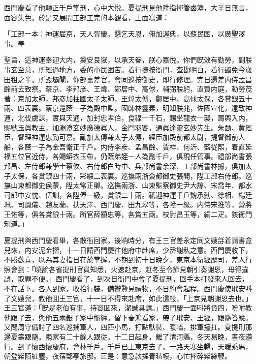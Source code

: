 西門慶看了他轉正千戶掌刑，心中大悦。夏提刑見他陞指揮管鹵簿，大半日無言，面容失色。於是又展開工部工完的本觀看，上面寫道：

\begin{myquote}[\markfont]
「工部一本：神運届京，天人胥慶。懇乞天恩，俯加渥典，以蘇民困，以廣聖澤事。奉

聖旨，這神運奉迎大内，奠安艮嶽，以承天眷，朕心嘉悦。你們旣效有勤勞，副朕事玄至意，所經過地方，委的小民困苦。着行撫按衙門，查勘明白，着行蠲免今歲田租之半。所毀壩閘，你部裏差官，會同巡按御史，即行修理。完日還差内侍孟昌齡前去致祭。蔡京、李邦彦、王煒、鄭居中、高俅，輔弼朕躬，直贊内庭，勳勞茂著：京加太師，邦彦加柱國太子太師，王煒太傅，鄭居中、高俅太保，各賞銀五十兩、四表裏。蔡京還蔭一子為殿中監。國師林靈素，明知朕兆，佐國宣化，遠致神運，北伐虜謀，實與天通，加封忠孝伯，食祿一千石，賜坐龍衣一襲，肩輿入内，賜號玉眞教主，加淵澄玄妙廣德眞人，金門羽客，通眞達靈玄妙先生。朱勔、黄經臣，督理神運忠勤可嘉。勔加太傅兼太子太傅，經臣加殿前都太尉，提督御前人船，各蔭一子為金吾衛正千戶。内侍李彦、孟昌齡、賈祥、何沂、藍従熙，着直延福五位官近侍，各賜蟒衣玉帶，仍蔭弟姪一人為副千戶，俱現任管事。禮部尚書張邦昌、左侍郎兼學士蔡攸、右侍郎白時中、兵部尚書余深、工部尚書林攄，俱加太子太保，各賞銀四十兩，彩緞二表裏。巡撫兩浙僉都御史張閣，陞工部右侍郎。巡撫山東都御史侯蒙，陞太常正卿。巡撫兩浙、山東監察御史尹大諒、宋喬年、都水司郎中安忱、伍訓，各陞俸一級，賞銀二十兩。祇迎神運千戶魏承勳、徐相、楊廷珮、司鳳儀、趙友蘭、扶天澤、西門慶、田九皋等，各陞一級。内侍宋推等，營將王佑等，俱各賞銀十兩。所官薛顥忠等，各賞五兩。校尉昌玉等，絹二疋。該衙門知道。」
\end{myquote}

夏提刑與西門慶看畢，各散衙回家。後晌時分，有王三官差永定同文嫂㧱着請書盒兒來，内安泥金摺，十一日請西門慶往他府中赴席，少罄謝私之意。西門慶收下，不勝歡喜，以為其妻指日在於掌握。不期到初十日晚夕，東京本衛經歷司，差人行照會到：「曉諭各省提刑官員知悉，火速赴京，赶冬至令節見朝引奏謝恩，毋得違誤，取罪不便。」西門慶看了，到次日衙門中會了夏提刑，回手本打發來人回去，不在話下。各人到家，收拾行裝，備辦贄見禮物，不日約會起程。西門慶使玳安呌了文嫂兒，教他囬王三官，十一日不得來赴席，如此這般，「上京見朝謝恩去也。」王三官道：「旣是老伯有事，待容囬來，潔誠具請。」西門慶一面呌將賁四，吩咐教他跟了去，與他五兩銀子家中盤纏。留下春鴻看家，帶了玳安、王經，跟隨答應。又問周守備討了四名巡捕軍人，四匹小馬，打點馱裝、暖轎，排軍擡扛。夏提刑那邊夏壽跟隨。兩家有二十餘人跟従。十二日起身，離了清河縣，冬天易晚，晝夜趲行。到了懷西懷慶府，會林千戶。千戶已上東京去了。一路天寒坐轎，天暖乘馬，朝登紫陌紅塵，夜宿郵亭旅邸。正是：意急款搖青毡幙，心忙摔碎紫絲鞭。

